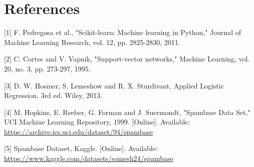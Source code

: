 \documentclass[11pt]{article}
\begin{document}
\section*{References}
\label{sec:org7cab096}


[1] F. Pedregosa et al., "Scikit-learn: Machine learning in Python," Journal of Machine Learning Research, vol. 12, pp. 2825-2830, 2011.

[2] C. Cortes and V. Vapnik, "Support-vector networks," Machine Learning, vol. 20, no. 3, pp. 273-297, 1995.

[3] D. W. Hosmer, S. Lemeshow and R. X. Sturdivant, Applied Logistic Regression, 3rd ed. Wiley, 2013.

[4] M. Hopkins, E. Reeber, G. Forman and J. Suermondt, "Spambase Data Set," UCI Machine Learning Repository, 1999. [Online]. Available: \url{https://archive.ics.uci.edu/dataset/94/spambase}

[5] Spambase Dataset, Kaggle. [Online]. Available: \url{https://www.kaggle.com/datasets/somesh24/spambase}
\end{document}
